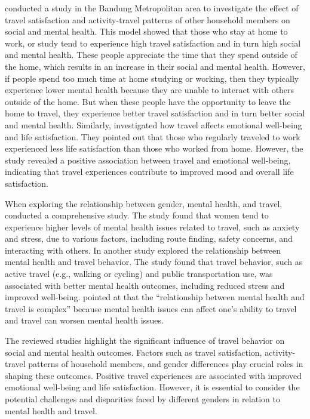 \documentclass[
  letterpaper,
  authoryear]{elsarticle}
\begin{document}
\citet{syahputri2022} conducted a study in the Bandung Metropolitan area
to investigate the effect of travel satisfaction and activity-travel
patterns of other household members on social and mental health. This
model showed that those who stay at home to work, or study tend to
experience high travel satisfaction and in turn high social and mental
health. These people appreciate the time that they spend outside of the
home, which results in an increase in their social and mental health.
However, if people spend too much time at home studying or working, then
they typically experience lower mental health because they are unable to
interact with others outside of the home. But when these people have the
opportunity to leave the home to travel, they experience better travel
satisfaction and in turn better social and mental health. Similarly,
\citet{friman2017} investigated how travel affects emotional well-being
and life satisfaction. They pointed out that those who regularly
traveled to work experienced less life satisfaction than those who
worked from home. However, the study revealed a positive association
between travel and emotional well-being, indicating that travel
experiences contribute to improved mood and overall life satisfaction.

When exploring the relationship between gender, mental health, and
travel, \citet{mackett2022} conducted a comprehensive study. The study
found that women tend to experience higher levels of mental health
issues related to travel, such as anxiety and stress, due to various
factors, including route finding, safety concerns, and interacting with
others. In another study \citet{mackett2021} explored the relationship
between mental health and travel behavior. The study found that travel
behavior, such as active travel (e.g., walking or cycling) and public
transportation use, was associated with better mental health outcomes,
including reduced stress and improved well-being. \citet{mackett2021}
pointed at that the ``relationship between mental health and travel is
complex'' because mental health issues can affect one's ability to
travel and travel can worsen mental health issues.

The reviewed studies highlight the significant influence of travel
behavior on social and mental health outcomes. Factors such as travel
satisfaction, activity-travel patterns of household members, and gender
differences play crucial roles in shaping these outcomes. Positive
travel experiences are associated with improved emotional well-being and
life satisfaction. However, it is essential to consider the potential
challenges and disparities faced by different genders in relation to
mental health and travel.
\end{document}
